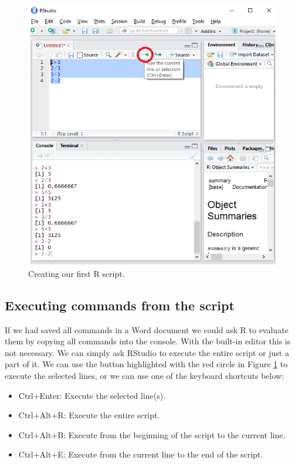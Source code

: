 \documentclass[]{book}
\providecommand{\tightlist}{%
  \setlength{\itemsep}{0pt}\setlength{\parskip}{0pt}}
\begin{document}
\begin{figure}

{\centering \includegraphics[width=0.9\linewidth]{_resources/chapter_Rbasic/r2} 

}

\caption{Creating our first R script. }\label{fig:rguide5}
\end{figure}

\hypertarget{executing-commands-from-the-script}{%
\subsection*{Executing commands from the script}\label{executing-commands-from-the-script}}

If we had saved all commands in a Word document we could ask R to evaluate them by copying all commands into the console. With the built-in editor this is not necessary. We can simply ask RStudio to execute the entire script or just a part of it. We can use the button highlighted with the red circle in Figure \ref{fig:rguide5} to execute the selected lines, or we can use one of the keyboard shortcuts below:

\begin{itemize}
\tightlist
\item
  Ctrl+Enter: Execute the selected line(s).
\item
  Ctrl+Alt+R: Execute the entire script.
\item
  Ctrl+Alt+B: Execute from the beginning of the script to the current line.
\item
  Ctrl+Alt+E: Execute from the current line to the end of the script.
\end{itemize}
\end{document}
